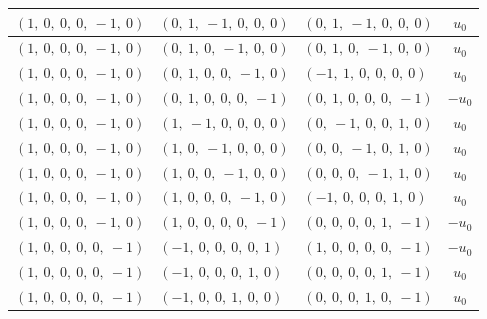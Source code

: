 \documentclass[11pt]{article}
\theoremstyle{definition}
\begin{document}
\begin{longtable}{|l|l|l|c|}
    \hline
    $\left( 1, \  0, \  0, \  0, \  -1, \  0\right)$ & $\left( 0, \  1, \  -1, \  0, \  0, \  0\right)$ & $\left( 0, \  1, \  -1, \  0, \  0, \  0\right)$ & $u_{0}$ \\
    \hline
    $\left( 1, \  0, \  0, \  0, \  -1, \  0\right)$ & $\left( 0, \  1, \  0, \  -1, \  0, \  0\right)$ & $\left( 0, \  1, \  0, \  -1, \  0, \  0\right)$ & $u_{0}$ \\
    \hline
    $\left( 1, \  0, \  0, \  0, \  -1, \  0\right)$ & $\left( 0, \  1, \  0, \  0, \  -1, \  0\right)$ & $\left( -1, \  1, \  0, \  0, \  0, \  0\right)$ & $u_{0}$ \\
    \hline
    $\left( 1, \  0, \  0, \  0, \  -1, \  0\right)$ & $\left( 0, \  1, \  0, \  0, \  0, \  -1\right)$ & $\left( 0, \  1, \  0, \  0, \  0, \  -1\right)$ & $- u_{0}$ \\
    \hline
    $\left( 1, \  0, \  0, \  0, \  -1, \  0\right)$ & $\left( 1, \  -1, \  0, \  0, \  0, \  0\right)$ & $\left( 0, \  -1, \  0, \  0, \  1, \  0\right)$ & $u_{0}$ \\
    \hline
    $\left( 1, \  0, \  0, \  0, \  -1, \  0\right)$ & $\left( 1, \  0, \  -1, \  0, \  0, \  0\right)$ & $\left( 0, \  0, \  -1, \  0, \  1, \  0\right)$ & $u_{0}$ \\
    \hline
    $\left( 1, \  0, \  0, \  0, \  -1, \  0\right)$ & $\left( 1, \  0, \  0, \  -1, \  0, \  0\right)$ & $\left( 0, \  0, \  0, \  -1, \  1, \  0\right)$ & $u_{0}$ \\
    \hline
    $\left( 1, \  0, \  0, \  0, \  -1, \  0\right)$ & $\left( 1, \  0, \  0, \  0, \  -1, \  0\right)$ & $\left( -1, \  0, \  0, \  0, \  1, \  0\right)$ & $u_{0}$ \\
    \hline
    $\left( 1, \  0, \  0, \  0, \  -1, \  0\right)$ & $\left( 1, \  0, \  0, \  0, \  0, \  -1\right)$ & $\left( 0, \  0, \  0, \  0, \  1, \  -1\right)$ & $- u_{0}$ \\
    \hline
    $\left( 1, \  0, \  0, \  0, \  0, \  -1\right)$ & $\left( -1, \  0, \  0, \  0, \  0, \  1\right)$ & $\left( 1, \  0, \  0, \  0, \  0, \  -1\right)$ & $- u_{0}$ \\
    \hline
    $\left( 1, \  0, \  0, \  0, \  0, \  -1\right)$ & $\left( -1, \  0, \  0, \  0, \  1, \  0\right)$ & $\left( 0, \  0, \  0, \  0, \  1, \  -1\right)$ & $u_{0}$ \\
    \hline
    $\left( 1, \  0, \  0, \  0, \  0, \  -1\right)$ & $\left( -1, \  0, \  0, \  1, \  0, \  0\right)$ & $\left( 0, \  0, \  0, \  1, \  0, \  -1\right)$ & $u_{0}$ \\

\end{longtable}
\end{document}
